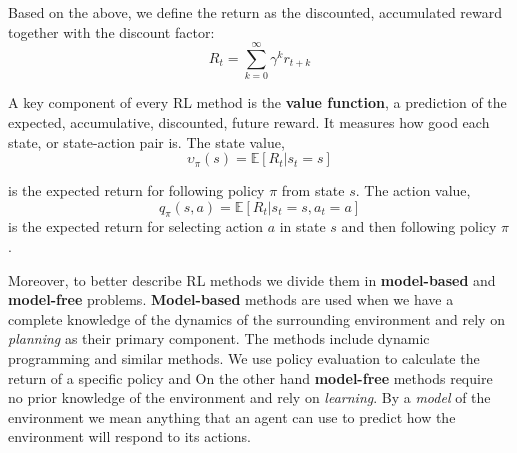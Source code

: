 \documentclass[11pt, a4paper]{article}
\begin{document}
Based on the above, we define the return as the discounted, accumulated reward together with the discount factor:
\begin{equation}
    R_t = \sum_{k=0}^{\infty}{\gamma^k r_{t+k}}
\end{equation}

A key component of every RL method is the \textbf{value function}, a prediction of the expected, accumulative, discounted, future reward. It measures
how good each state, or state-action pair is. The state value,
\begin{equation}
    \upsilon_\pi(s) =\mathbb{E}[R_t | s_t = s]
\end{equation}

is the expected return for following policy $\pi$ from state $s$. The action value,
\begin{equation}
    q_\pi(s,a) =\mathbb{E}[R_t | s_t = s, a_t = a]
\end{equation}
is the expected return for selecting action $a$ in state $s$ and then following policy $\pi$.

Moreover, to better describe RL methods we divide them in
\textbf{model-based} and \textbf{model-free} problems. \textbf{Model-based} methods are used when we have a
complete knowledge of the dynamics of the surrounding environment and rely on \textit{planning} as their primary component.
The methods include dynamic programming and similar methods. We use policy evaluation to calculate the return of a specific policy and
On the other hand \textbf{model-free} methods require no prior knowledge of the environment and rely on \textit{learning}.
By a \textit{model} of the environment we mean anything that an agent can use to predict how the environment will respond to
its actions.



{}

\end{document}
